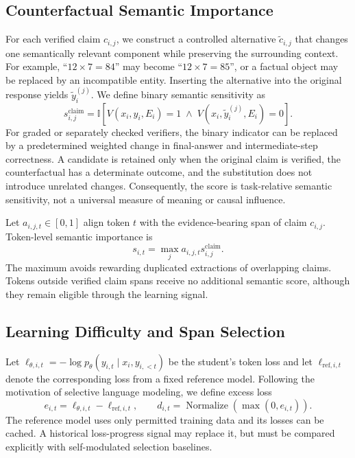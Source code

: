 \documentclass{article}
\newcommand{\ind}{\mathbb{I}}
\begin{document}
\subsection{Counterfactual Semantic Importance}
For each verified claim $c_{i,j}$, we construct a controlled alternative $\tilde c_{i,j}$ that changes one semantically relevant component while preserving the surrounding context. For example, ``$12\times7=84$'' may become ``$12\times7=85$'', or a factual object may be replaced by an incompatible entity. Inserting the alternative into the original response yields $\tilde y_i^{(j)}$. We define binary semantic sensitivity as
\begin{equation}
 s^{\mathrm{claim}}_{i,j}=\ind\left[V(x_i,y_i,E_i)=1\;\wedge\;V(x_i,\tilde y_i^{(j)},E_i)=0\right].
 \label{eq:claim-importance}
\end{equation}
For graded or separately checked verifiers, the binary indicator can be replaced by a predetermined weighted change in final-answer and intermediate-step correctness. A candidate is retained only when the original claim is verified, the counterfactual has a determinate outcome, and the substitution does not introduce unrelated changes. Consequently, the score is task-relative semantic sensitivity, not a universal measure of meaning or causal influence.

Let $a_{i,j,t}\in[0,1]$ align token $t$ with the evidence-bearing span of claim $c_{i,j}$. Token-level semantic importance is
\begin{equation}
 s_{i,t}=\max_j a_{i,j,t}s^{\mathrm{claim}}_{i,j}.
 \label{eq:token-importance}
\end{equation}
The maximum avoids rewarding duplicated extractions of overlapping claims. Tokens outside verified claim spans receive no additional semantic score, although they remain eligible through the learning signal.

\subsection{Learning Difficulty and Span Selection}
Let $\ell_{\theta,i,t}=-\log p_\theta(y_{i,t}\mid x_i,y_{i,<t})$ be the student's token loss and let $\ell_{\mathrm{ref},i,t}$ denote the corresponding loss from a fixed reference model. Following the motivation of selective language modeling, we define excess loss
\begin{equation}
 e_{i,t}=\ell_{\theta,i,t}-\ell_{\mathrm{ref},i,t},\qquad d_{i,t}=\operatorname{Normalize}(\max(0,e_{i,t})).
 \label{eq:difficulty}
\end{equation}
The reference model uses only permitted training data and its losses can be cached. A historical loss-progress signal may replace it, but must be compared explicitly with self-modulated selection baselines.
\end{document}

